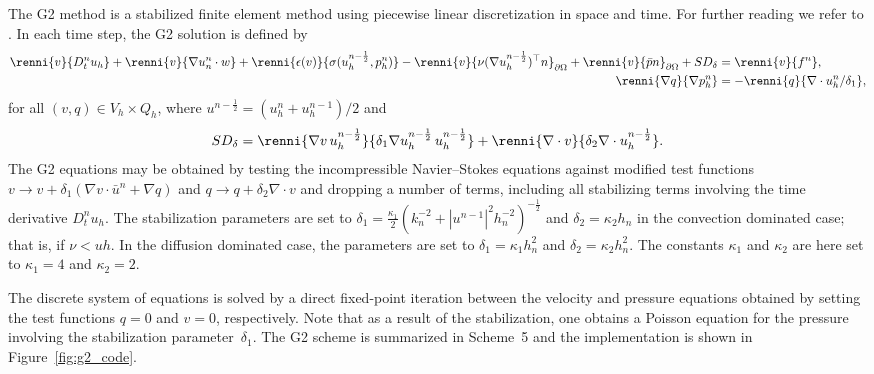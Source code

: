 The G2 method is a stabilized finite element method using piecewise
linear discretization in space and time. For further reading we refer
to \citet{HoffmanJohnson2007}. In each time step, the G2 solution is
defined by
\begin{equation}
  \begin{split}
    \renni{v}{D_t^n u_h}
    + \renni{v}{\nabla u_n^n \cdot w}
    + \renni{\epsilon(v)}{\sigma(u_h^{n-\frac{1}{2}}, p_h^n)}
    - \renni{v}{\nu (\nabla u_h^{n-\frac{1}{2}})^{\top} n}_{\partial\Omega}
    + \renni{v}{\bar{p} n}_{\partial\Omega}
    + SD_{\delta}
    &= \renni{v}{f^n}, \\
    \renni{\nabla q}{\nabla p_h^n} &= - \renni{q}{\nabla \cdot u_h^n/\delta_1},
  \end{split}
\end{equation}
for all $(v, q) \in V_h \times Q_h$, where $u^{n-\frac{1}{2}} =
({u}^{n}_h + {u}^{n-1}_h) / 2$ and
\begin{equation}
  SD_{\delta}
  = \renni{\nabla v \,  u_h^{n-\frac{1}{2}}}{\delta_1 \nabla u_h^{n-\frac{1}{2}} \, u_h^{n-\frac{1}{2}}}
  + \renni{\nabla \cdot v}{\delta_2 \nabla \cdot u_h^{n-\frac{1}{2}}}.
\end{equation}
The G2 equations may be obtained by testing the incompressible
Navier--Stokes equations against modified test functions $v
\rightarrow v + \delta_1 (\nabla v \cdot \bar{u}^{n} + \nabla q)$ and
$q \rightarrow q + \delta_2 \nabla \cdot v$ and dropping a number of
terms, including all stabilizing terms involving the time derivative
$D_t^n u_h$. The stabilization parameters are set to $\delta_{1} =
\frac{\kappa_1}{2}(k_{n}^{-2} +
|u^{n-1}|^{2}h_{n}^{-2})^{-\frac{1}{2}}$ and $\delta_{2}= \kappa_2
h_n$ in the convection dominated case; that is, if $\nu < uh$. In the
diffusion dominated case, the parameters are set to $\delta_{1} =
\kappa_1 h_{n}^2$ and $\delta_{2} = \kappa_2 h_{n}^2$. The constants
$\kappa_1$ and $\kappa_2$ are here set to $\kappa_1 = 4$ and $\kappa_2
= 2$.

The discrete system of equations is solved by a direct fixed-point
iteration between the velocity and pressure equations obtained by
setting the test functions $q = 0$ and $v = 0$, respectively. Note that
as a result of the stabilization, one obtains a Poisson equation for
the pressure involving the stabilization parameter~$\delta_1$. The G2
scheme is summarized in Scheme~5 and the implementation is shown in
Figure~\ref{fig:g2_code}.


